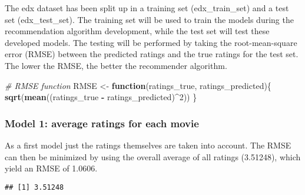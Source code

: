 \documentclass[
]{article}
\newenvironment{Shaded}{\begin{snugshade}}{\end{snugshade}}
\newcommand{\CommentTok}[1]{\textcolor[rgb]{0.56,0.35,0.01}{\textit{#1}}}
\newcommand{\ControlFlowTok}[1]{\textcolor[rgb]{0.13,0.29,0.53}{\textbf{#1}}}
\newcommand{\DecValTok}[1]{\textcolor[rgb]{0.00,0.00,0.81}{#1}}
\newcommand{\KeywordTok}[1]{\textcolor[rgb]{0.13,0.29,0.53}{\textbf{#1}}}
\newcommand{\NormalTok}[1]{#1}
\newcommand{\OperatorTok}[1]{\textcolor[rgb]{0.81,0.36,0.00}{\textbf{#1}}}
\newcommand{\StringTok}[1]{\textcolor[rgb]{0.31,0.60,0.02}{#1}}
\begin{document}
The edx dataset has been split up in a training set (edx\_train\_set)
and a test set (edx\_test\_set). The training set will be used to train
the models during the recommendation algorithm development, while the
test set will test these developed models. The testing will be performed
by taking the root-mean-square error (RMSE) between the predicted
ratings and the true ratings for the test set. The lower the RMSE, the
better the recommender algorithm.

\begin{Shaded}
\begin{Highlighting}[]
\CommentTok{# RMSE function}
\NormalTok{RMSE <-}\StringTok{ }\ControlFlowTok{function}\NormalTok{(ratings_true, ratings_predicted)\{}
  \KeywordTok{sqrt}\NormalTok{(}\KeywordTok{mean}\NormalTok{((ratings_true }\OperatorTok{-}\StringTok{ }\NormalTok{ratings_predicted)}\OperatorTok{^}\DecValTok{2}\NormalTok{))}
\NormalTok{\}}
\end{Highlighting}
\end{Shaded}

\hypertarget{model-1-average-ratings-for-each-movie}{%
\subsubsection{Model 1: average ratings for each
movie}\label{model-1-average-ratings-for-each-movie}}

As a first model just the ratings themselves are taken into account. The
RMSE can then be minimized by using the overall average of all ratings
(3.51248), which yield an RMSE of 1.0606.

\begin{Shaded}
\end{Shaded}

\begin{verbatim}
## [1] 3.51248
\end{verbatim}

\begin{Shaded}
\end{Shaded}
\end{document}
